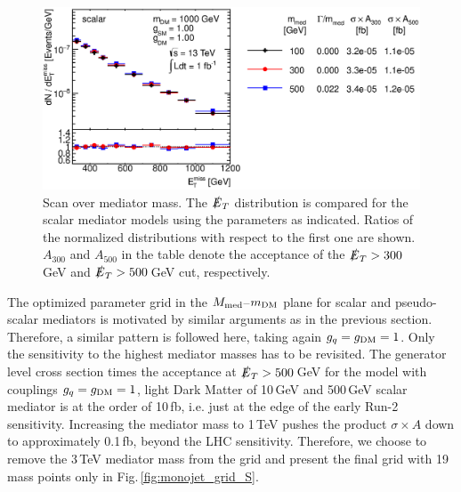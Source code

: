 \begin{figure}
\centering
\includegraphics[width=0.9\linewidth]{figures/monojet/scan_mMed_S_1000.eps}
\caption{Scan over mediator mass. The $\slashed{E}_T$ distribution is compared for the scalar mediator models using the parameters as indicated. Ratios of the normalized distributions with respect to the first one are shown. $A_{300}$ and $A_{500}$ in the table denote the acceptance of the $\slashed{E}_T>300$\,GeV and $\slashed{E}_T>500$\,GeV cut, respectively.}
\label{fig:monojet_scan_S_mMed1000}
\end{figure}


The optimized parameter grid in the $M_{\rm{med}}$--$m_{\rm{DM}}$ plane for scalar and pseudo-scalar mediators is motivated by similar arguments as in the previous section. Therefore, a similar pattern is followed here, taking again $g_q=g_{\rm{DM}}=1$. Only the sensitivity to the highest mediator masses has to be revisited.
The generator level cross section times the acceptance at $\slashed{E}_T>500$\,GeV for the model with couplings $g_q=g_{\rm{DM}}=1$, light Dark Matter of 10\,GeV and 500\,GeV scalar mediator is at the order of 10\,fb, i.e. just at the edge of the early Run-2 sensitivity. Increasing the mediator mass to 1\,TeV pushes the product $\sigma\times A$ down to approximately 0.1\,fb, beyond the LHC sensitivity. Therefore, we choose to remove the 3\,TeV mediator mass from the grid and present the final grid with 19 mass points only in Fig.\,\ref{fig:monojet_grid_S}.

